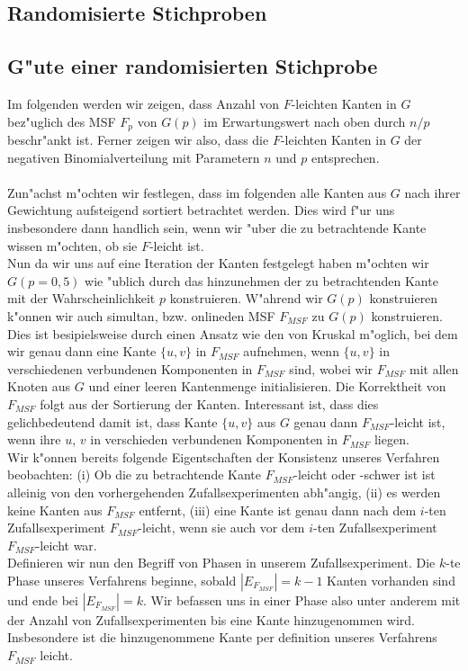 \subsection{Randomisierte Stichproben}

\subsection{G"ute einer randomisierten Stichprobe}

Im folgenden werden wir zeigen, dass Anzahl von $F$-leichten Kanten in $G$ 
    bez"uglich des MSF $F_p$ von $G(p)$ im Erwartungswert nach oben durch
    $n/p$ beschr"ankt ist. 
    Ferner zeigen wir also, dass die $F$-leichten Kanten in $G$ der negativen
    Binomialverteilung mit Parametern $n$ und $p$ entsprechen.\\
\\
Zun"achst m"ochten wir festlegen, dass im folgenden alle Kanten aus $G$ nach 
    ihrer Gewichtung aufsteigend sortiert betrachtet werden.
    Dies wird f"ur uns insbesondere dann handlich sein, wenn wir "uber die zu 
    betrachtende Kante wissen m"ochten, ob sie $F$-leicht ist.\\
Nun da wir uns auf eine Iteration der Kanten festgelegt haben m"ochten wir 
    $G(p=0,5)$ wie "ublich durch das hinzunehmen der zu betrachtenden Kante mit
    der Wahrscheinlichkeit $p$ konstruieren.
    W"ahrend wir $G(p)$ konstruieren k"onnen wir auch simultan, bzw. 
    \glqq online\grqq den MSF $F_{MSF}$ zu $G(p)$ konstruieren.
    Dies ist besipielsweise durch einen Ansatz wie den von Kruskal m"oglich, bei
    dem wir genau dann eine Kante $\{u,v\}$ in $F_{MSF}$ aufnehmen, wenn $\{u,v\}$
    in verschiedenen verbundenen Komponenten in $F_{MSF}$ sind, wobei wir 
    $F_{MSF}$ mit allen Knoten aus $G$ und einer leeren Kantenmenge 
    initialisieren.
    Die Korrektheit von $F_{MSF}$ folgt aus der Sortierung der Kanten.
    Interessant ist, dass dies gelichbedeutend damit ist, dass Kante $\{u,v\}$
    aus $G$ genau dann $F_{MSF}$-leicht ist, wenn ihre $u$, $v$ in verschieden 
    verbundenen Komponenten in $F_{MSF}$ liegen.\\
Wir k"onnen bereits folgende Eigentschaften der Konsistenz unseres Verfahren 
    beobachten: 
    (i) Ob die zu betrachtende Kante $F_{MSF}$-leicht oder -schwer ist 
    ist alleinig von den vorhergehenden Zufallsexperimenten abh"angig,
    (ii) es werden keine Kanten aus $F_{MSF}$ entfernt,
    (iii) eine Kante ist genau dann nach dem $i$-ten Zufallsexperiment 
    $F_{MSF}$-leicht, wenn sie auch vor dem $i$-ten Zufallsexperiment $F_{MSF}$-leicht
    war.\\
Definieren wir nun den Begriff von Phasen in unserem Zufallsexperiment.
    Die $k$-te Phase unseres Verfahrens beginne, sobald $|E_{F_{MSF}}| = k-1$ Kanten
    vorhanden sind und ende bei $|E_{F_{MSF}}| = k$.
    Wir befassen uns in einer Phase also unter anderem mit der Anzahl von 
    Zufallsexperimenten bis eine Kante hinzugenommen wird.
    Insbesondere ist die hinzugenommene Kante per definition unseres Verfahrens
    $F_{MSF}$ leicht.\\
